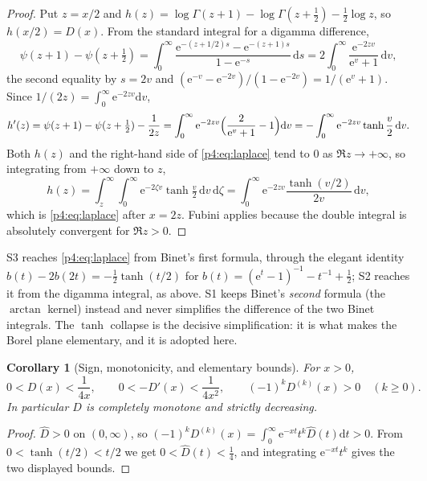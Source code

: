 \documentclass[11pt,a4paper,oneside]{book}
\theoremstyle{plain}
\newtheorem{corollary}[theorem]{Corollary}
\theoremstyle{definition}
\theoremstyle{remark}
\newcommand{\e}{\mathrm{e}}
\newcommand{\dd}{\mathrm{d}}
\begin{document}
\begin{proof}
Put $z=x/2$ and
$h(z)=\log\Gamma(z+1)-\log\Gamma(z+\tfrac12)-\tfrac12\log z$, so
$h(x/2)=D(x)$.  From the standard integral for a digamma difference,
\[
  \psi(z+1)-\psi(z+\tfrac12)
  =\int_0^\infty\frac{\e^{-(z+1/2)s}-\e^{-(z+1)s}}{1-\e^{-s}}\,\dd s
  =2\int_0^\infty\frac{\e^{-2zv}}{\e^{v}+1}\,\dd v,
\]
the second equality by $s=2v$ and
$(\e^{-v}-\e^{-2v})/(1-\e^{-2v})=1/(\e^{v}+1)$.  Since
$1/(2z)=\int_0^\infty\e^{-2zv}\dd v$,
\[
  h'(z)=\psi(z+1)-\psi(z+\tfrac12)-\frac1{2z}
  =\int_0^\infty\e^{-2zv}\Bigl(\frac2{\e^{v}+1}-1\Bigr)\dd v
  =-\int_0^\infty\e^{-2zv}\tanh\frac v2\,\dd v .
\]
Both $h(z)$ and the right-hand side of \cref{p4:eq:laplace} tend to $0$ as
$\Re z\to+\infty$, so integrating from $+\infty$ down to $z$,
\[
  h(z)=\int_z^\infty\!\!\int_0^\infty\e^{-2\zeta v}\tanh\tfrac v2
        \,\dd v\,\dd\zeta
      =\int_0^\infty\e^{-2zv}\frac{\tanh(v/2)}{2v}\,\dd v ,
\]
which is \cref{p4:eq:laplace} after $x=2z$.  Fubini applies because the double
integral is absolutely convergent for $\Re z>0$.
\end{proof}

\begin{sourcebox}
\textsf{S3} reaches \cref{p4:eq:laplace} from Binet's first formula, through
the elegant identity
$b(t)-2b(2t)=-\tfrac12\tanh(t/2)$ for
$b(t)=(\e^t-1)^{-1}-t^{-1}+\tfrac12$; \textsf{S2} reaches it from the digamma
integral, as above.  \textsf{S1} keeps Binet's \emph{second} formula
(the $\arctan$ kernel) instead and never simplifies the difference of the two
Binet integrals.  The $\tanh$ collapse is the decisive simplification: it is
what makes the Borel plane elementary, and it is adopted here.
\end{sourcebox}

\begin{corollary}[Sign, monotonicity, and elementary bounds]
\label{p4:cor:D-bounds}
For $x>0$,
\begin{equation}
  0<D(x)<\frac1{4x},
  \qquad
  0<-D'(x)<\frac1{4x^{2}},
  \qquad
  (-1)^{k}D^{(k)}(x)>0\quad(k\ge0).
  \label{p4:eq:D-bounds}
\end{equation}
In particular $D$ is completely monotone and strictly decreasing.
\end{corollary}

\begin{proof}
$\widehat D>0$ on $(0,\infty)$, so
$(-1)^kD^{(k)}(x)=\int_0^\infty\e^{-xt}t^k\widehat D(t)\dd t>0$.  From
$0<\tanh(t/2)<t/2$ we get $0<\widehat D(t)<\tfrac14$, and integrating
$\e^{-xt}t^k$ gives the two displayed bounds.
\end{proof}
\end{document}
